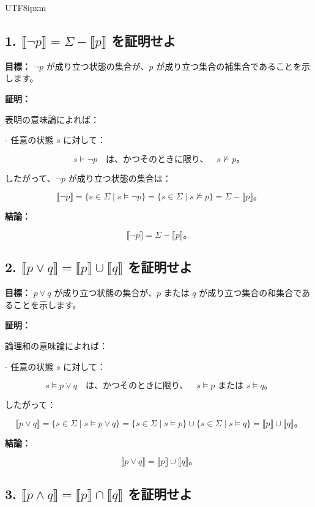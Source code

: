 \documentclass[12pt,a4paper]{article}
\begin{document}
\begin{CJK}{UTF8}{ipxm}
\subsection*{1. \( \llbracket \neg p \rrbracket = \Sigma - \llbracket p \rrbracket \) を証明せよ}

\textbf{目標：} \( \neg p \) が成り立つ状態の集合が、\( p \) が成り立つ集合の補集合であることを示します。

\textbf{証明：}

表明の意味論によれば：

- 任意の状態 \( s \) に対して：

  \[
  s \models \neg p \quad \text{は、かつそのときに限り、} \quad s \not\models p。
  \]

したがって、\( \neg p \) が成り立つ状態の集合は：

\[
\llbracket \neg p \rrbracket = \{ s \in \Sigma \mid s \models \neg p \} = \{ s \in \Sigma \mid s \not\models p \} = \Sigma - \llbracket p \rrbracket。
\]

\textbf{結論：}

\[
\llbracket \neg p \rrbracket = \Sigma - \llbracket p \rrbracket。
\]

\subsection*{2. \( \llbracket p \lor q \rrbracket = \llbracket p \rrbracket \cup \llbracket q \rrbracket \) を証明せよ}

\textbf{目標：} \( p \lor q \) が成り立つ状態の集合が、\( p \) または \( q \) が成り立つ集合の和集合であることを示します。

\textbf{証明：}

論理和の意味論によれば：

- 任意の状態 \( s \) に対して：

  \[
  s \models p \lor q \quad \text{は、かつそのときに限り、} \quad s \models p \text{ または } s \models q。
  \]

したがって：

\[
\llbracket p \lor q \rrbracket = \{ s \in \Sigma \mid s \models p \lor q \} = \{ s \in \Sigma \mid s \models p \} \cup \{ s \in \Sigma \mid s \models q \} = \llbracket p \rrbracket \cup \llbracket q \rrbracket。
\]

\textbf{結論：}

\[
\llbracket p \lor q \rrbracket = \llbracket p \rrbracket \cup \llbracket q \rrbracket。
\]

\subsection*{3. \( \llbracket p \land q \rrbracket = \llbracket p \rrbracket \cap \llbracket q \rrbracket \) を証明せよ}


\end{CJK}
\end{document}
